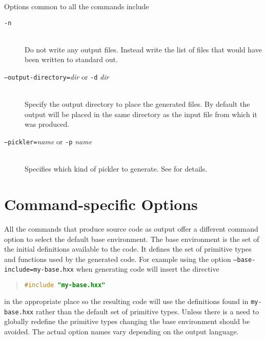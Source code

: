 Options common to all the commands include
\begin{description}
  \item[\normalfont\texttt{-n}] \mbox{}\\
    Do not write any output files.
    Instead write the list of files that would have been written to standard out.
  \item[\normalfont\texttt{--output-directory=}\textit{dir} or \texttt{-d} \textit{dir}] \mbox{}\\
    Specify the output directory to place the generated files.
    By default the output will be placed in the same directory as the
    input file from which it was produced.
  \item[\normalfont\texttt{--pickler=}\textit{name} or \texttt{-p} \textit{name}] \mbox{}\\
    Specifies which kind of pickler to generate.
    See  for details.
\end{description}%

\section*{Command-specific Options}

All the commands that produce source code as output offer a different
command option to select the default base environment.
The base environment is the set of the initial definitions available to the code.
It defines the set of primitive types and functions used by the generated code.
For example using the option \texttt{--base-include=my-base.hxx}
when generating \Cplusplus{} code will insert the directive
\begin{quote}\begin{lstlisting}[language=c++]
#include "my-base.hxx"
\end{lstlisting}\end{quote}%
in the appropriate place so the resulting code will use the definitions found in
\texttt{my-base.hxx} rather than the default set of primitive types.
Unless there is a need to globally redefine
the primitive types changing the base environment should be avoided.
The actual option names vary depending on the output language.

